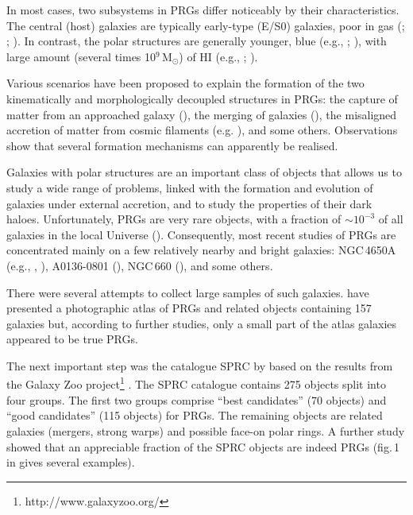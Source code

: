 \documentclass[a4paper,fleqn,usenatbib]{mnras}
\begin{document}
In most cases, two subsystems in PRGs differ noticeably by their characteristics.
The central (host) galaxies are typically early-type (E/S0) galaxies, poor in gas
(\citealt{wms1987}; \citealt{ffb2012}; \citealt{rc2015}).
In contrast, the polar structures are generally younger, blue 
(e.g., \citealt{rhy1994}; \citealt{iod2002}), 
with large amount (several times 10$^9$\,M$_{\odot}$) of HI 
(e.g., \citealt{vg1987}; \citealt{vdr2000}). 

Various scenarios have been proposed to explain the formation of the two 
kinematically and morphologically decoupled structures in PRGs:
the capture of matter from an approached galaxy (\citealt{reshsotn1997,bourcomb2003}), 
the merging of galaxies (\citealt{bekki1997,bekki1998,bourcomb2003}), 
the misaligned accretion of matter from cosmic filaments 
(e.g. \citealt{maccio2006,brook2008}), and some others. Observations show that 
several formation mechanisms can apparently be realised.

Galaxies with polar structures are an important class of objects that allows us
to study a wide range of problems, linked with the formation and evolution 
of galaxies under external accretion, and to study the properties of their
dark haloes. Unfortunately, PRGs are very rare objects, with a fraction 
of $\sim10^{-3}$  of all galaxies in the local Universe 
(\citealt{whit1990, resh2011}). Consequently, most recent studies
of PRGs are concentrated mainly on a few relatively nearby and bright galaxies:
NGC\,4650A (e.g., \citealt{cia2014}, \citealt{icc2015}), A0136-0801
(\citealt{sia2015}), NGC\,660 (\citealt{swm2017}), and some others.


There were several attempts to collect large samples of such galaxies.
\citet{whit1990} have presented a photographic
atlas of PRGs and related objects containing 157 galaxies
but, according to further studies, only a small part of the atlas galaxies 
appeared to be true PRGs. 

The next important step was the catalogue SPRC by \citet{moiseev2011} 
based on the results from the Galaxy Zoo project\footnote{http://www.galaxyzoo.org/} \citep{2008MNRAS.389.1179L}. The SPRC
catalogue contains 275 objects split into four groups. The first
two groups comprise ``best candidates'' (70 objects) and
``good candidates'' (115 objects) for PRGs. The remaining objects are
related galaxies (mergers, strong warps) and possible
face-on polar rings. A further study showed that an appreciable fraction 
of the SPRC objects are indeed PRGs (fig.\,1 in \citealt{moiseev2015} gives 
several examples).
\end{document}
